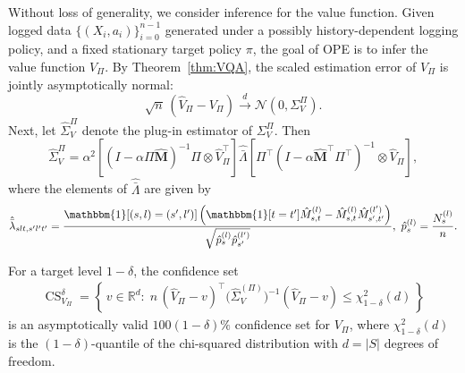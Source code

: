 \documentclass[twoside,11pt]{article}
\newcommand{\pow}[1]{^{(#1)}}%
\numberwithin{equation}{section}
\newcommand{\lp}{\left(}
\newcommand{\rp}{\right)}
\newcommand{\Ncal}{\mathcal{N}}
\newcommand{\indicator}{\mathbbm{1}}
\begin{document}
Without loss of generality, we consider inference for the value function.
Given logged data $\{(X_i, a_i)\}_{i=0}^{n-1}$ generated under a possibly history-dependent logging policy, and a fixed stationary target policy $\pi$, the goal of OPE is to infer the value function $V_\Pi$.
By Theorem~\ref{thm:VQA}, the scaled estimation error of $V_\Pi$ is jointly asymptotically normal:
\[
\sqrt{n}\,(\hat V_\Pi - V_\Pi) \overset{d}{\rightarrow} \Ncal(0,\Sigma_V^\Pi).
\]
Next, let $\hat \Sigma_V^\Pi$ denote the plug-in estimator of $\Sigma_V^\Pi$. Then
\[
\hat \Sigma_V^\Pi = \alpha^2\!\left[
 (I-\alpha\Pi\hat{\mathbf{M}})^{-1}\Pi\otimes \hat V_\Pi^\top
 \right]\! \hat{\bar{\Lambda}}
 \!\left[
 \Pi^\top(I-\alpha \hat{\mathbf{M}}^\top\Pi^\top)^{-1}\otimes \hat V_\Pi
 \right],
\]
where the elements of $\hat{\bar{\Lambda}}$ are given by
\begin{align*}
    \hat{\bar{\lambda}}_{slt,s'l't'} =  \frac{\indicator[(s,l)=(s',l')]\lp \indicator[t=t'] \hat M_{s,t}\pow l- \hat M_{s,t}\pow l \hat M_{s',t'}\pow {l'}\rp}{\sqrt{\hat{p}_s\pow l \hat{p}_{s'}\pow{l'}}}, \ \hat{p}_s\pow l = \frac{N_s \pow l}{n}.
\end{align*}

For a target level $1-\delta$, the confidence set
\begin{align*}
\operatorname{CS}^{\delta}_{V_\Pi}
=\left\{\, v\in\mathbb{R}^{d}:\;
n\,(\hat V_\Pi - v)^{\top}\big(\widehat{\Sigma}^{(\Pi)}_V\big)^{-1}(\hat V_\Pi - v)
\le \chi^2_{1-\delta}(d)\,\right\}
\end{align*}
is an asymptotically valid $100(1-\delta)\%$ confidence set for $V_\Pi$, where $\chi^{2}_{1-\delta}(d)$ is the $(1-\delta)$-quantile of the chi-squared distribution with $d = |S|$ degrees of freedom.
\end{document}
